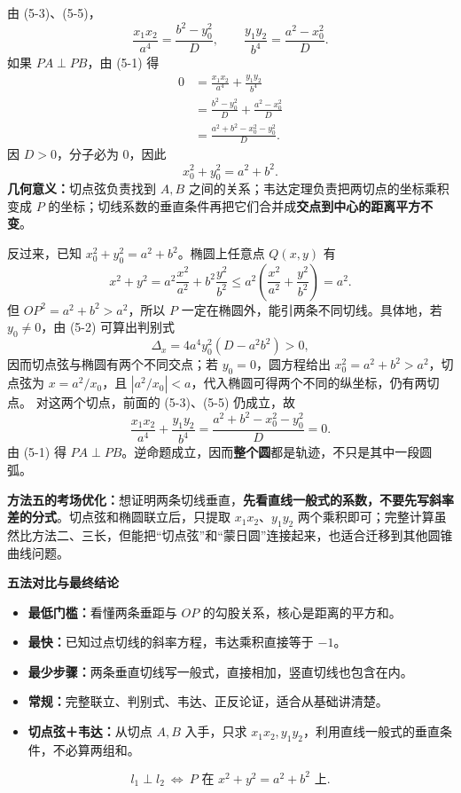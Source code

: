 \begin{proofbox}
\begin{description}[style=nextline, leftmargin=2.8em, labelsep=0.5em, itemsep=0.53em]
    \item[\textbf{第 5 步（只代两个乘积，直接得到蒙日圆）：}]
      由 (5-3)、(5-5)，
      \[
        \frac{x_1x_2}{a^4}=\frac{b^2-y_0^2}{D},\qquad
        \frac{y_1y_2}{b^4}=\frac{a^2-x_0^2}{D}.
      \]
      如果 $PA\perp PB$，由 (5-1) 得
      \[
      \begin{aligned}
        0&=\frac{x_1x_2}{a^4}+\frac{y_1y_2}{b^4}\\
         &=\frac{b^2-y_0^2}{D}+\frac{a^2-x_0^2}{D}\\
         &=\frac{a^2+b^2-x_0^2-y_0^2}{D}.
      \end{aligned}
      \]
      因 $D>0$，分子必为 $0$，因此
      \[
        \boxed{x_0^2+y_0^2=a^2+b^2}.
      \]
      \textbf{几何意义：}切点弦负责找到 $A,B$ 之间的关系；韦达定理负责把两切点的坐标乘积变成 $P$ 的坐标；切线系数的垂直条件再把它们合并成\textbf{交点到中心的距离平方不变}。

    \item[\textbf{第 6 步（逆命题：证明圆上每一点都成立）：}]
      反过来，已知 $x_0^2+y_0^2=a^2+b^2$。椭圆上任意点 $Q(x,y)$ 有
      \[
        x^2+y^2=a^2\frac{x^2}{a^2}+b^2\frac{y^2}{b^2}
        \le a^2\left(\frac{x^2}{a^2}+\frac{y^2}{b^2}\right)=a^2.
      \]
      但 $OP^2=a^2+b^2>a^2$，所以 $P$ 一定在椭圆外，能引两条不同切线。具体地，若 $y_0\ne0$，由 (5-2) 可算出判别式
      \[
        \Delta_x=4a^4y_0^2(D-a^2b^2)>0,
      \]
      因而切点弦与椭圆有两个不同交点；若 $y_0=0$，圆方程给出 $x_0^2=a^2+b^2>a^2$，切点弦为 $x=a^2/x_0$，且 $|a^2/x_0|<a$，代入椭圆可得两个不同的纵坐标，仍有两切点。
      对这两个切点，前面的 (5-3)、(5-5) 仍成立，故
      \[
        \frac{x_1x_2}{a^4}+\frac{y_1y_2}{b^4}
        =\frac{a^2+b^2-x_0^2-y_0^2}{D}=0.
      \]
      由 (5-1) 得 $PA\perp PB$。逆命题成立，因而\textbf{整个圆}都是轨迹，不只是其中一段圆弧。
  \end{description}

  \textbf{方法五的考场优化：}想证明两条切线垂直，\textbf{先看直线一般式的系数，不要先写斜率差的分式}。切点弦和椭圆联立后，只提取 $x_1x_2$、$y_1y_2$ 两个乘积即可；完整计算虽然比方法二、三长，但能把“切点弦”和“蒙日圆”连接起来，也适合迁移到其他圆锥曲线问题。

  \textbf{\textcolor{CProof}{五法对比与最终结论}}
  \begin{itemize}[leftmargin=*, itemsep=0.3em]
    \item \textbf{最低门槛：}看懂两条垂距与 $OP$ 的勾股关系，核心是距离的平方和。
    \item \textbf{最快：}已知过点切线的斜率方程，韦达乘积直接等于 $-1$。
    \item \textbf{最少步骤：}两条垂直切线写一般式，直接相加，竖直切线也包含在内。
    \item \textbf{常规：}完整联立、判别式、韦达、正反论证，适合从基础讲清楚。
    \item \textbf{切点弦＋韦达：}从切点 $A,B$ 入手，只求 $x_1x_2,y_1y_2$，利用直线一般式的垂直条件，不必算两组和。
  \end{itemize}
  \[
    \boxed{l_1\perp l_2\ \Longleftrightarrow\ P\text{ 在 }x^2+y^2=a^2+b^2\text{ 上}.}
  \]
\end{proofbox}
